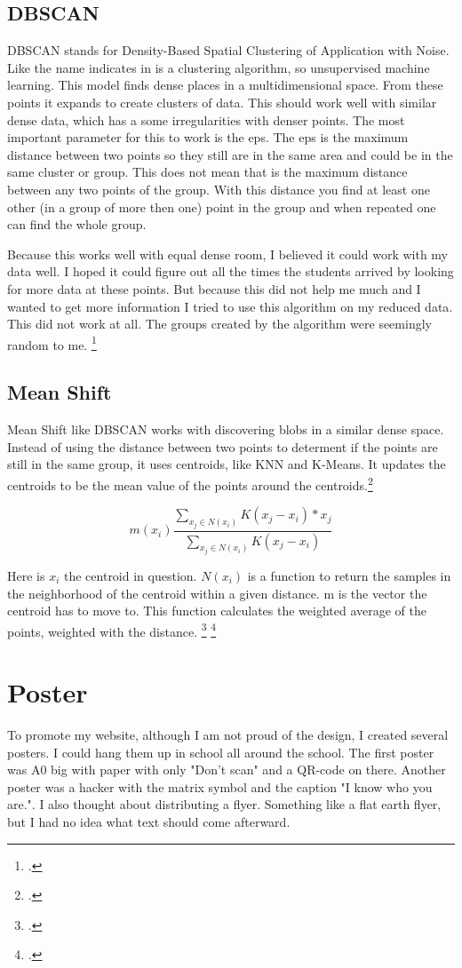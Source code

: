 \documentclass[11pt]{article}
\begin{document}
\subsection{DBSCAN}
DBSCAN stands for Density-Based Spatial Clustering of Application with Noise. Like the name indicates in is  a clustering algorithm, so unsupervised machine learning. This model finds dense places in a multidimensional space. From these points it expands  to create clusters of data. This should work well with similar dense data, which has a some irregularities with denser points. The most important parameter for this to work is the eps. The eps is the maximum distance between two points so they still are in the same area and could be in the same cluster or group. This does not mean that is the maximum distance between any two points of the group. With this distance you find at least one other (in a group of more then one) point in the group and when repeated one can find the whole group. 

Because this works well with equal dense room, I believed it could work with my data well. I hoped it could figure out all the times the students arrived by looking for more data at these points. But because this did not help me much and I wanted to get more information I tried to use this algorithm on my reduced data. This did not work at all. The groups created by the algorithm were seemingly random to me. \footcite{dbscan}

\subsection{Mean Shift}
Mean Shift like DBSCAN works with discovering blobs in a similar dense space. Instead of using the distance between two points to determent if the points are still in the same group, it uses centroids, like KNN and K-Means. It updates the centroids to be the mean value of the points around the centroids.\footcite{meanshift}

\[m(x_i) \frac{\sum_{x_j \in N(x_i)}K(x_j-x_i)*x_j}{\sum_{x_j \in N(x_i)} K(x_j-x_i)}\]

Here is \(x_i\) the centroid in question. \(N(x_i)\) is a function to return the samples in the neighborhood of the centroid within a given distance. m is the vector the centroid has to move to. This function calculates the weighted average of the points, weighted with the distance. 
\footcite{meanshift} \footcite{meanshiftformula}



\section{Poster}
To promote my website, although I am not proud of the design, I created several posters. I could hang them up in school all around the school. The first poster was A0 big with paper with only "Don't scan" and a QR-code on there. Another poster was a hacker with the matrix symbol and the caption "I know who you are.". I also thought about distributing a flyer. Something like a flat earth flyer, but I had no idea what text should come afterward. 
\end{document}
